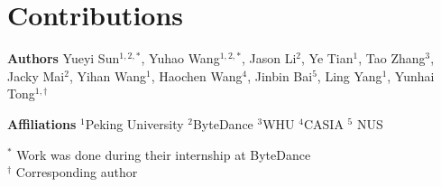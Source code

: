 \section{Contributions}
\label{sec:contribution}

\textbf{Authors} Yueyi Sun$^{1,2,*}$, Yuhao Wang$^{1,2,*}$, Jason Li$^{2}$, Ye Tian$^{1}$, Tao Zhang$^{3}$, Jacky Mai$^{2}$, Yihan Wang$^{1}$, Haochen Wang$^{4}$, Jinbin Bai$^{5}$, Ling Yang$^{1}$, Yunhai Tong$^{1,\dagger}$

\vspace{2mm}

\textbf{Affiliations} $^{1}$Peking University \quad $^{2}$ByteDance \quad $^{3}$WHU \quad $^{4}$CASIA \quad $^{5}$ NUS

\vspace{2mm}

$^{*}$ Work was done during their internship at ByteDance\\
$^{\dagger}$ Corresponding author
